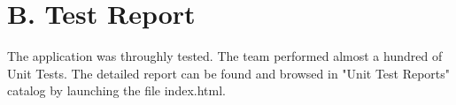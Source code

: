 \documentclass[a4paper,11pt,twoside]{report}
\theoremstyle{definition}
\begin{document}
\begin{enumerate}
\begin{enumerate}
\end{enumerate}

\end{enumerate}












\chapter*{B. Test Report}

The application was throughly tested. The team performed almost a hundred of Unit Tests. The detailed report can be found and browsed in "Unit Test Reports" catalog by launching the file index.html.
\thispagestyle{empty}
\end{document}
